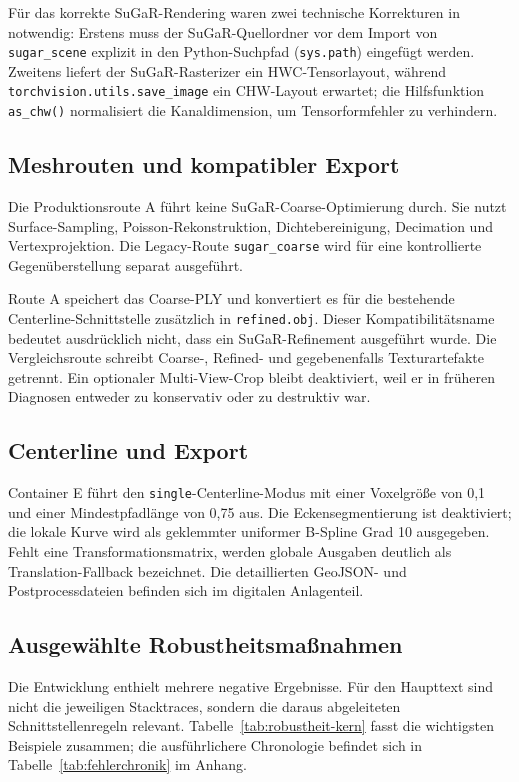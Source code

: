 Für das korrekte SuGaR-Rendering waren zwei technische Korrekturen in
 notwendig: Erstens muss der SuGaR-Quellordner
 vor dem Import von \texttt{sugar\_scene} explizit in den
Python-Suchpfad (\texttt{sys.path}) eingefügt werden. Zweitens liefert der
SuGaR-Rasterizer ein HWC-Tensorlayout, während \texttt{torchvision.utils.save\_image}
ein CHW-Layout erwartet; die Hilfsfunktion \texttt{as\_chw()} normalisiert die
Kanaldimension, um Tensorformfehler zu verhindern.

\subsection{Meshrouten und kompatibler Export}

Die Produktionsroute A führt keine SuGaR-Coarse-Optimierung durch. Sie nutzt
Surface-Sampling, Poisson-Rekonstruktion, Dichtebereinigung, Decimation und
Vertexprojektion. Die Legacy-Route \texttt{sugar\_coarse} wird für eine
kontrollierte Gegenüberstellung separat ausgeführt.

Route A speichert das Coarse-PLY und konvertiert es für die bestehende
Centerline-Schnittstelle zusätzlich in \texttt{refined.obj}. Dieser
Kompatibilitätsname bedeutet ausdrücklich nicht, dass ein SuGaR-Refinement
ausgeführt wurde. Die Vergleichsroute schreibt Coarse-, Refined- und
gegebenenfalls Texturartefakte getrennt. Ein optionaler Multi-View-Crop bleibt
deaktiviert, weil er in früheren Diagnosen entweder zu konservativ oder zu
destruktiv war.

\subsection{Centerline und Export}

Container E führt den \texttt{single}-Centerline-Modus mit einer Voxelgröße von
0,1 und einer Mindestpfadlänge von 0,75 aus. Die Eckensegmentierung ist
deaktiviert; die lokale Kurve wird als geklemmter uniformer B-Spline Grad 10
ausgegeben. Fehlt eine Transformationsmatrix, werden globale Ausgaben deutlich
als Translation-Fallback bezeichnet. Die detaillierten GeoJSON- und
Postprocessdateien befinden sich im digitalen Anlagenteil.

\subsection{Ausgewählte Robustheitsmaßnahmen}

Die Entwicklung enthielt mehrere negative Ergebnisse. Für den Haupttext sind
nicht die jeweiligen Stacktraces, sondern die daraus abgeleiteten
Schnittstellenregeln relevant. Tabelle~\ref{tab:robustheit-kern} fasst die
wichtigsten Beispiele zusammen; die ausführlichere Chronologie befindet sich
in Tabelle~\ref{tab:fehlerchronik} im Anhang.

